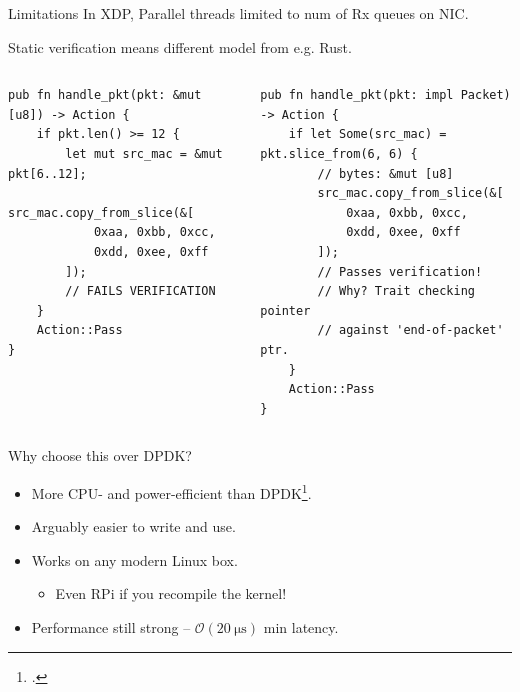 \documentclass[aspectratio=169,xcolor={dvipsnames}
,handout %
]{beamer}
\begin{document}
\begin{frame}[fragile]{Limitations}
	In XDP, Parallel threads limited to num of Rx queues on NIC.
	
	\pause Static verification means different model from e.g. Rust. \pause
	\begin{columns}
		\begin{column}{0.5\linewidth}
\begin{verbatim}
pub fn handle_pkt(pkt: &mut [u8]) -> Action {
	if pkt.len() >= 12 {
		let mut src_mac = &mut pkt[6..12];
		src_mac.copy_from_slice(&[
			0xaa, 0xbb, 0xcc,
			0xdd, 0xee, 0xff
		]);
		// FAILS VERIFICATION
	}
	Action::Pass
}
\end{verbatim}
		\end{column}
\begin{column}{0.5\linewidth}
	\begin{verbatim}
pub fn handle_pkt(pkt: impl Packet) -> Action {
	if let Some(src_mac) = pkt.slice_from(6, 6) {
		// bytes: &mut [u8]
		src_mac.copy_from_slice(&[
			0xaa, 0xbb, 0xcc,
			0xdd, 0xee, 0xff
		]);
		// Passes verification!
		// Why? Trait checking pointer
		// against 'end-of-packet' ptr.
	}
	Action::Pass
}
	\end{verbatim}
\end{column}
	\end{columns}
\end{frame}

\begin{frame}{Why choose this over DPDK?}
	\begin{itemize}[<+->]
		\item More \alert{CPU-} and \alert{power-efficient} than DPDK\footcite{DBLP:conf/conext/Hoiland-Jorgensen18}.
		\item Arguably easier to write and use.
		\item Works on any modern Linux box.
		\begin{itemize}
			\item Even RPi if you recompile the kernel!
		\end{itemize}
		\item Performance still strong -- $\mathcal{O}(\qty{20}{\micro\second})$ min latency.
	\end{itemize}
\end{frame}
\end{document}
